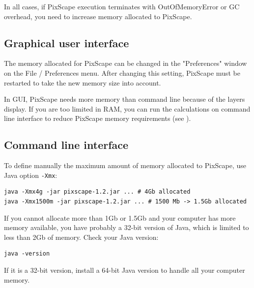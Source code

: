 \documentclass{report}
\begin{document}
In all cases, if PixScape execution terminates with OutOfMemoryError
or GC overhead, you need to increase memory allocated to PixScape.


\subsection{Graphical user interface}
The memory allocated for PixScape can be changed in the "Preferences" window on the File / Preferences menu. After changing this setting, PixScape must be restarted to take the new memory size into account.

In GUI, PixScape needs more memory than command line because of the layers display. If you are too limited in RAM, you can run the calculations on command line interface to reduce PixScape memory requirements (see ).

\subsection{Command line interface}
To define manually the maximum amount of memory allocated to PixScape, use Java option \verb|-Xmx|:

\begin{Verbatim}
java -Xmx4g -jar pixscape-1.2.jar ... # 4Gb allocated
java -Xmx1500m -jar pixscape-1.2.jar ... # 1500 Mb -> 1.5Gb allocated
\end{Verbatim}

If you cannot allocate more than 1Gb or 1.5Gb and your computer has more memory available, you have
probably a 32-bit version of Java, which is limited to less than 2Gb of memory.  Check your Java version:
\begin{Verbatim}
java -version
\end{Verbatim}
If it is a 32-bit version, install a 64-bit Java version to handle all your computer memory.


\end{document}
